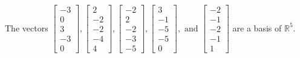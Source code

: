 \begin{exercise}
\begin{exerciseStatement}
  \end{exerciseStatement}
  \begin{exerciseAnswer}
   The vectors \(\left[\begin{array}{r}
-3 \\
0 \\
3 \\
-3 \\
0
\end{array}\right] , \left[\begin{array}{r}
2 \\
-2 \\
-2 \\
-4 \\
4
\end{array}\right] , \left[\begin{array}{r}
-2 \\
2 \\
-2 \\
-3 \\
-5
\end{array}\right] , \left[\begin{array}{r}
3 \\
-1 \\
-5 \\
-5 \\
0
\end{array}\right] , \text{ and } \left[\begin{array}{r}
-2 \\
-1 \\
-2 \\
-1 \\
1
\end{array}\right]\) 
  	 are  a basis of \(\mathbb{R}^5\).
  


  \end{exerciseAnswer}
\end{exercise}